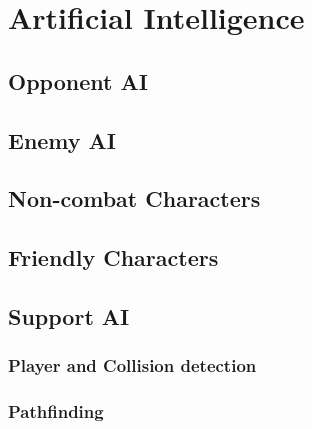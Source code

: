 
\section{Artificial Intelligence}

\subsection{Opponent AI}

\subsection{Enemy AI}

\subsection{Non-combat Characters}

\subsection{Friendly Characters}

\subsection{Support AI}

\subsubsection{Player and Collision detection}

\subsubsection{Pathfinding}

\newpage